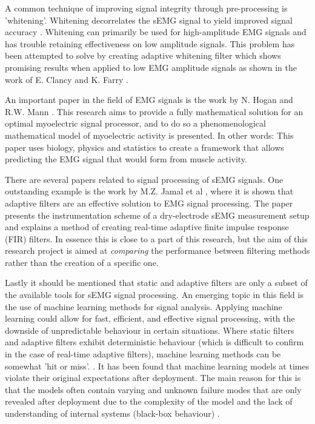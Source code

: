 A common technique of improving signal integrity through pre-processing is 'whitening'. Whitening decorrelates the sEMG signal to yield improved signal accuracy \cite{emg_whitening}. 
Whitening can primarily be used for high-amplitude EMG signals and has trouble retaining effectiveness on low amplitude signals. This problem has been attempted to solve by creating adaptive whitening filter which shows promising results when applied to low EMG amplitude signals as shown in the work of E. Clancy and K. Farry \cite{adaptive_whitening}. 


An important paper in the field of EMG signals is the work by N. Hogan and R.W. Mann \cite{optimal_myoprocessor}. This research aims to provide a fully mathematical solution for an optimal myoelectric signal processor, and to do so a phenomenological mathematical model of myoelectric activity is presented. In other words: This paper uses biology, physics and statistics to create a framework that allows predicting the EMG signal that would form from muscle activity.

There are several papers related to signal processing of sEMG signals.
One outstanding example is the work by M.Z. Jamal et al  \cite{adaptive_filter_dry_electrode}, where it is shown that adaptive filters are an effective solution to EMG signal processing. The paper presents the instrumentation scheme of a dry-electrode sEMG measurement setup and explains a method of creating real-time adaptive finite impulse response (FIR) filters. In essence this is close to a part of this research, but the aim of this research project is aimed at \textit{comparing} the performance between filtering methods rather than the creation of a specific one.

Lastly it should be mentioned that static and adaptive filters are only a subset of the available tools for sEMG signal processing. An emerging topic in this field is the use of machine learning methods for signal analysis. Applying machine learning could allow for fast, efficient, and effective signal processing, with the downside of unpredictable behaviour in certain situations. Where static filters and adaptive filters exhibit deterministic behaviour (which is difficult to confirm in the case of real-time adaptive filters), machine learning methods can be somewhat 'hit or miss'. \cite{ml_semg_processing_1,ml_semg_processing_2}. It has been found that machine learning models at times violate their original expectations after deployment. The main reason for this is that the models often contain varying and unknown failure modes that are only revealed after deployment due to the complexity of the model and the lack of understanding of internal systems (black-box behaviour) \cite{microsoft_machine_learning_reliable}.

